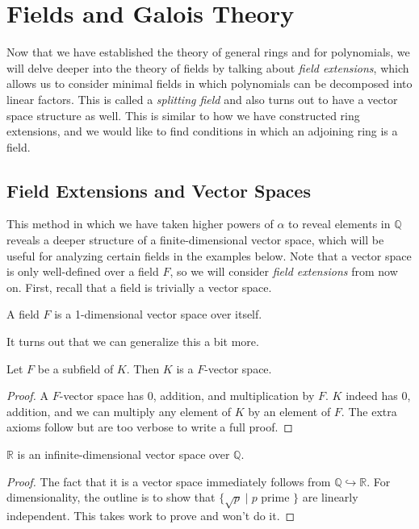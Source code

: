 \section{Fields and Galois Theory} 

  Now that we have established the theory of general rings and for polynomials, we will delve deeper into the theory of fields by talking about \textit{field extensions}, which allows us to consider minimal fields in which polynomials can be decomposed into linear factors. This is called a \textit{splitting field} and also turns out to have a vector space structure as well. This is similar to how we have constructed ring extensions, and we would like to find conditions in which an adjoining ring is a field. 

\subsection{Field Extensions and Vector Spaces}

  This method in which we have taken higher powers of $\alpha$ to reveal elements in $\mathbb{Q}$ reveals a deeper structure of a finite-dimensional vector space, which will be useful for analyzing certain fields in the examples below. Note that a vector space is only well-defined over a field $F$, so we will consider \textit{field extensions} from now on. First, recall that a field is trivially a vector space. 

  \begin{lemma}
    A field $F$ is a 1-dimensional vector space over itself. 
  \end{lemma} 

  It turns out that we can generalize this a bit more. 

  \begin{theorem}
    \label{thm:fields_vector_space}
    Let $F$ be a subfield of $K$. Then $K$ is a $F$-vector space. 
  \end{theorem}
  \begin{proof}
    A $F$-vector space has $0$, addition, and multiplication by $F$. $K$ indeed has $0$, addition, and we can multiply any element of $K$ by an element of $F$. The extra axioms follow but are too verbose to write a full proof. 
  \end{proof}

  \begin{corollary} 
    $\mathbb{R}$ is an infinite-dimensional vector space over $\mathbb{Q}$. 
  \end{corollary}
  \begin{proof}
    The fact that it is a vector space immediately follows from $\mathbb{Q} \hookrightarrow \mathbb{R}$. For dimensionality, the outline is to show that $\{\sqrt{p} \mid p \text{ prime }\}$ are linearly independent. This takes work to prove and won't do it. 
  \end{proof}

